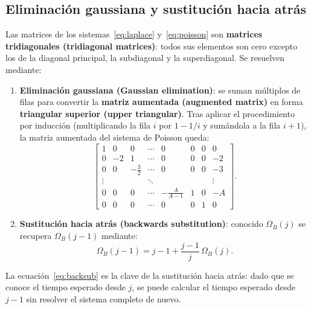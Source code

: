\documentclass[12pt]{article}
\begin{document}
\subsection{Eliminaci\'on gaussiana y sustituci\'on hacia atr\'as}

Las matrices de los sistemas~\eqref{eq:laplace} y~\eqref{eq:poisson}
son \textbf{matrices tridiagonales (tridiagonal matrices)}: todos sus elementos son
cero excepto los de la diagonal principal, la subdiagonal y la superdiagonal.
Se resuelven mediante:

\begin{enumerate}
  \item \textbf{Eliminaci\'on gaussiana (Gaussian elimination)}: se suman
        m\'ultiplos de filas para convertir la \textbf{matriz aumentada (augmented matrix)}
        en forma \textbf{triangular superior (upper triangular)}.
        Tras aplicar el procedimiento por inducci\'on (multiplicando la fila $i$
        por $1 - 1/i$ y sum\'andola a la fila $i+1$), la matriz aumentada del
        sistema de Poisson queda:
        \begin{equation}
          \left[\begin{array}{ccccccc|c}
            1 & 0 & 0 & \cdots & 0 & 0 & 0 & 0 \\
            0 & -2 & 1 & \cdots & 0 & 0 & 0 & -2 \\
            0 & 0 & -\tfrac{3}{2} & \cdots & 0 & 0 & 0 & -3 \\
            \vdots & & & \ddots & & & & \vdots \\
            0 & 0 & 0 & \cdots & -\tfrac{A}{A-1} & 1 & 0 & -A \\
            0 & 0 & 0 & \cdots & 0 & 0 & 1 & 0
          \end{array}\right].
          \label{eq:upper}
        \end{equation}
  \item \textbf{Sustituci\'on hacia atr\'as (backwards substitution)}: conocido $\Omega_B(j)$
        se recupera $\Omega_B(j-1)$ mediante:
        \begin{equation}
          \Omega_B(j-1) = j - 1 + \frac{j-1}{j}\,\Omega_B(j).
          \label{eq:backsub}
        \end{equation}
\end{enumerate}

\begin{intuicionmat}
La ecuaci\'on~\eqref{eq:backsub} es la clave de la sustituci\'on hacia atr\'as:
dado que se conoce el tiempo esperado desde $j$, se puede calcular el tiempo
esperado desde $j-1$ sin resolver el sistema completo de nuevo.
\end{intuicionmat}
\end{document}

